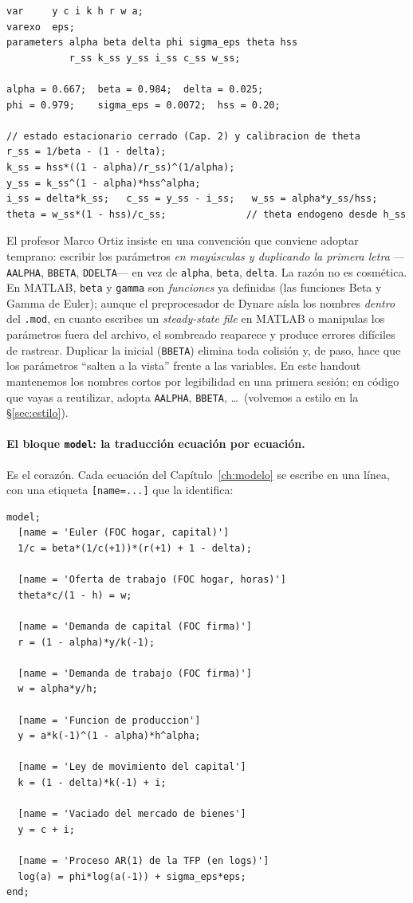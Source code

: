 \documentclass[11pt,a4paper]{report}
\newenvironment{tipbox}[1][]{%
  \begin{tcolorbox}[tipstyle, title={\tipicon~~Buena práctica%
    \ifx\relax#1\relax\else: #1\fi}]}%
{\end{tcolorbox}}
\newcommand{\code}[1]{\texttt{#1}}
\newcommand{\tipicon}{\raisebox{-1pt}{\begin{tikzpicture}[scale=0.12,baseline=-0.5ex,line cap=round]
  \draw[line width=1.9pt] (0,1.05) circle (0.92);
  \draw[line width=1.9pt] (-0.48,0.12) -- (0.48,0.12);
  \draw[line width=1.9pt] (-0.44,-0.18) -- (0.44,-0.18);
  \draw[line width=1.9pt] (-0.34,-0.48) -- (0.34,-0.48);
  \draw[line width=1.5pt] (0,2.35) -- (0,2.95);
  \draw[line width=1.5pt] (1.35,1.05) -- (1.95,1.05);
  \draw[line width=1.5pt] (-1.35,1.05) -- (-1.95,1.05);
  \draw[line width=1.5pt] (1.0,2.05) -- (1.45,2.5);
  \draw[line width=1.5pt] (-1.0,2.05) -- (-1.45,2.5);
\end{tikzpicture}}}
\begin{document}
\begin{lstlisting}
var     y c i k h r w a;
varexo  eps;
parameters alpha beta delta phi sigma_eps theta hss
           r_ss k_ss y_ss i_ss c_ss w_ss;

alpha = 0.667;  beta = 0.984;  delta = 0.025;
phi = 0.979;    sigma_eps = 0.0072;  hss = 0.20;

// estado estacionario cerrado (Cap. 2) y calibracion de theta
r_ss = 1/beta - (1 - delta);
k_ss = hss*((1 - alpha)/r_ss)^(1/alpha);
y_ss = k_ss^(1 - alpha)*hss^alpha;
i_ss = delta*k_ss;   c_ss = y_ss - i_ss;   w_ss = alpha*y_ss/hss;
theta = w_ss*(1 - hss)/c_ss;              // theta endogeno desde h_ss
\end{lstlisting}

\begin{tipbox}[nombres de parámetros]
El profesor Marco Ortiz insiste en una convención que conviene adoptar temprano:
escribir los parámetros \emph{en mayúsculas y duplicando la primera letra} ---
\code{AALPHA}, \code{BBETA}, \code{DDELTA}--- en vez de \code{alpha}, \code{beta},
\code{delta}. La razón no es cosmética. En MATLAB, \code{beta} y \code{gamma} son
\emph{funciones} ya definidas (las funciones Beta y Gamma de Euler); aunque el
preprocesador de Dynare aísla los nombres \emph{dentro} del \code{.mod}, en cuanto
escribes un \emph{steady-state file} en MATLAB o manipulas los parámetros fuera del
archivo, el sombreado reaparece y produce errores difíciles de rastrear. Duplicar
la inicial (\code{BBETA}) elimina toda colisión y, de paso, hace que los parámetros
``salten a la vista'' frente a las variables. En este handout mantenemos los
nombres cortos por legibilidad en una primera sesión; en código que vayas a
reutilizar, adopta \code{AALPHA}, \code{BBETA}, \dots \ (volvemos a estilo en la
\S\ref{sec:estilo}).
\end{tipbox}

\paragraph{El bloque \code{model}: la traducción ecuación por ecuación.} Es el
corazón. Cada ecuación del Capítulo~\ref{ch:modelo} se escribe en una línea, con
una etiqueta \code{[name=...]} que la identifica:

\begin{lstlisting}
model;
  [name = 'Euler (FOC hogar, capital)']
  1/c = beta*(1/c(+1))*(r(+1) + 1 - delta);

  [name = 'Oferta de trabajo (FOC hogar, horas)']
  theta*c/(1 - h) = w;

  [name = 'Demanda de capital (FOC firma)']
  r = (1 - alpha)*y/k(-1);

  [name = 'Demanda de trabajo (FOC firma)']
  w = alpha*y/h;

  [name = 'Funcion de produccion']
  y = a*k(-1)^(1 - alpha)*h^alpha;

  [name = 'Ley de movimiento del capital']
  k = (1 - delta)*k(-1) + i;

  [name = 'Vaciado del mercado de bienes']
  y = c + i;

  [name = 'Proceso AR(1) de la TFP (en logs)']
  log(a) = phi*log(a(-1)) + sigma_eps*eps;
end;
\end{lstlisting}
\end{document}
